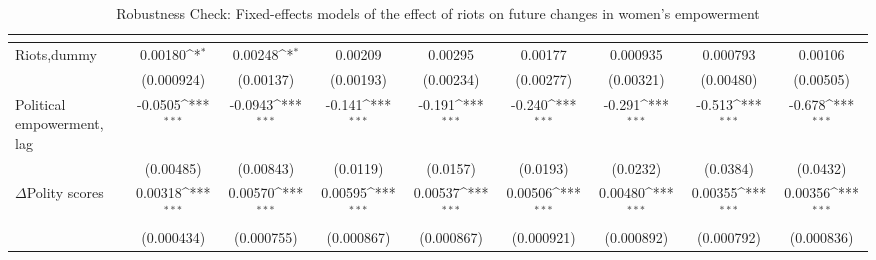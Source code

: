 \begin{table}[htbp]\centering
\def\sym#1{\ifmmode^{#1}\else\(^{#1}\)\fi}
\caption{Robustness Check: Fixed-effects models of the effect of riots on future changes in women's empowerment \label{fepolemriotnowar}}
\begin{tabular}{l*{8}{c}}
\hline\hline
                    &&&&&&&&\\
\hline
Riots,dummy         &     0.00180\sym{*}  &     0.00248\sym{*}  &     0.00209         &     0.00295         &     0.00177         &    0.000935         &    0.000793         &     0.00106         \\
                    &  (0.000924)         &   (0.00137)         &   (0.00193)         &   (0.00234)         &   (0.00277)         &   (0.00321)         &   (0.00480)         &   (0.00505)         \\
[1em]
Political empowerment, lag &     -0.0505\sym{***}&     -0.0943\sym{***}&      -0.141\sym{***}&      -0.191\sym{***}&      -0.240\sym{***}&      -0.291\sym{***}&      -0.513\sym{***}&      -0.678\sym{***}\\
                    &   (0.00485)         &   (0.00843)         &    (0.0119)         &    (0.0157)         &    (0.0193)         &    (0.0232)         &    (0.0384)         &    (0.0432)         \\
[1em]
$\Delta$Polity scores            &     0.00318\sym{***}&     0.00570\sym{***}&     0.00595\sym{***}&     0.00537\sym{***}&     0.00506\sym{***}&     0.00480\sym{***}&     0.00355\sym{***}&     0.00356\sym{***}\\
                    &  (0.000434)         &  (0.000755)         &  (0.000867)         &  (0.000867)         &  (0.000921)         &  (0.000892)         &  (0.000792)         &  (0.000836)         \\

\end{tabular}
\end{table}
